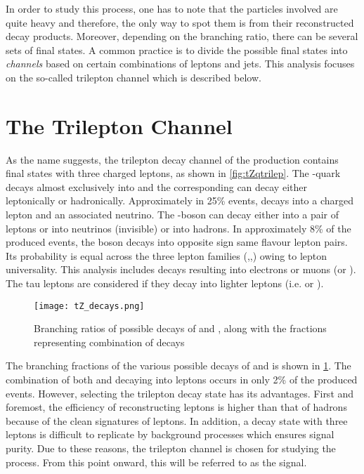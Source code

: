 In order to study this process, one has to note 
that the particles involved are quite heavy and therefore,
the only way to spot them is from their reconstructed decay products. Moreover, depending on the 
branching ratio, there can be several sets of final states.
A common practice is to divide the possible final states into \textit{channels}
based on certain combinations of leptons and jets. This analysis focuses on
the so-called trilepton channel which is described below.

\section{The \tZqsec Trilepton Channel}
As the name suggests, the trilepton decay channel of the \tZq production 
contains final states with three charged leptons, as shown in \cref{fig:tZqtrilep}. The
\Ptop-quark decays almost exclusively into \Pbottom\PW and the corresponding \PW can decay either
leptonically or hadronically. Approximately in 25\% events, \PW decays into a charged lepton and
an associated neutrino. The \PZ-boson can decay either into a pair of leptons or into neutrinos (invisible)
or into hadrons. In approximately 8\% of the produced events, the \PZ boson decays 
into opposite sign same flavour lepton pairs. Its probability 
is equal across the three lepton families (\Pelectron,\Pmuon,\Ptauon) owing to 
lepton universality. This analysis includes \PZ decays resulting into electrons or muons 
(\Pelectron\APelectron or \Pmuon\APmuon). The tau leptons are considered if they decay into lighter
leptons (i.e. \Pelectron or \Pmuon). 

\begin{figure}
  \centering
      \texttt{[image: tZ\_decays.png]}
      \caption{Branching ratios of possible decays of \Ptop and \PZ, along with the fractions representing
      combination of decays~\cite{irina:2018}}
         \label{fig:tZqdecays}
\end{figure}

The branching fractions of the various possible decays of \Ptop and \PZ is shown in \cref{fig:tZqdecays}.
The combination of both \Ptop and \PZ decaying into leptons occurs in only 2\% of the produced \tZq events.
However, selecting the trilepton decay state has its advantages. First and foremost, the efficiency of 
reconstructing leptons is higher than that of hadrons because of the clean signatures of leptons. 
In addition, a decay state with three leptons is difficult to replicate by 
background processes which ensures signal purity. 
Due to these reasons, the trilepton channel is chosen for studying the 
\tZq process. From this point onward, this will be referred to as the signal.

